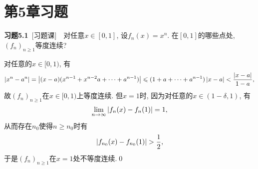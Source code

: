 \section{第5章习题}

    \textbf{习题5.1}\ [习题课]\ \ 对任意$ x\in[0,1] $, 设$ f_n(x)=x^n $. 在$ [0,1] $的哪些点处, $ (f_n)_{n\geqslant 1} $等度连续?
    \begin{Proof}
    对任意的$ x\in[0,1) $, 有
    \[
    \left| x^n-a^n \right| =\left| (x-a)(x^{n-1}+x^{n-2}a+\cdots+a^{n-1}) \right| \leqslant(1+a+\cdots+a^{n-1})\left| x-a \right| <\frac{\left| x-a \right| }{1-a},
    \]
    故$ (f_n)_{n\geqslant 1} $在$ x\in[0,1) $上等度连续. 但$ x=1 $时, 因为对任意的$ x\in(1-\delta,1) $, 有
    \[
    \lim_{n\to\infty}\left| f_n(x)-f_n(1) \right| =1,
    \]
    从而存在$ n_0 $使得$ n\geqslant n_0 $时有
    \[
    \left| f_{n_0}(x)-f_{n_0}(1) \right| >\frac{1}{2},
    \]
    于是$ (f_n)_{n\geqslant 1} $在$ x=1 $处不等度连续.\qed
    \end{Proof}

